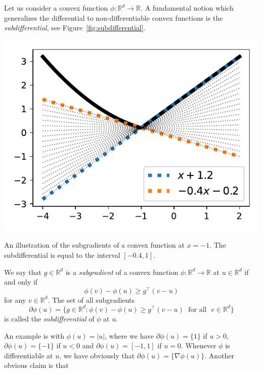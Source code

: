 \documentclass[
	fontsize=11pt, %
	twoside=false, %
	numbers=noenddot, %
]{kaobook}
\newcommand{\R}{\mathbb R}
\newcommand{\grad}{\nabla}
\begin{document}
Let us consider a convex function $\phi : \R^d \rightarrow \R$.
A fundamental notion which generalizes the differential to non-differentiable convex functions is the \emph{subdifferential}, see Figure~\ref{fig:subdifferential}.
\begin{marginfigure}
	\includegraphics{assets/subdifferential.pdf}
	\caption{An illustration of the subgradients of a convex function at $x=-1$. The subdifferential is equal to the interval $[-0.4, 1]$.}
	\label{fig:subdifferential}
\end{marginfigure}
\begin{definition}
	\label{def:subdifferential}
	We say that $g \in \R^d$ is a \emph{subgradient} of a convex function $\phi : \R^d \rightarrow \R$ at $u \in \R^d$ if and only if
	\begin{equation}
	 	\phi(v) - \phi(u) \geq g^\top (v - u)
	 \end{equation} 
	 for any $v \in \R^d$.
	 The set of all subgradients
	 \begin{equation*}
	 	\partial \phi(u) = \big\{ g \in \R^d : \phi(v) - \phi(u) \geq g^\top (v -u) 
	 	\; \text{ for all } \; v \in \R^d \}
	 \end{equation*}
	 is called the \emph{subdifferential} of $\phi$ at $u$.
\end{definition}
An example is with $\phi(u) = |u|$, where we have $\partial \phi(u) = \{ 1 \}$ if $u > 0$, $\partial \phi(u) = \{ -1 \}$ if $u < 0$ and $\partial \phi(u) = [-1, 1]$ if $u = 0$.
Whenever $\phi$ is differentiable at $u$, we have obviously that $\partial \phi(u) = \{  \grad \phi(u) \}$.
Another obvious claim is that
\end{document}
